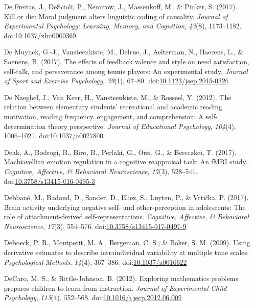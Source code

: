 \documentclass[english,man]{apa6}
\theoremstyle{definition}
\theoremstyle{definition}
\theoremstyle{definition}
\theoremstyle{remark}
\begin{document}
\hypertarget{ref-DeFreitas2017}{}
De Freitas, J., DeScioli, P., Nemirow, J., Massenkoff, M., \& Pinker, S.
(2017). Kill or die: Moral judgment alters linguistic coding of
causality. \emph{Journal of Experimental Psychology: Learning, Memory,
and Cognition}, \emph{43}(8), 1173--1182.
doi:\href{https://doi.org/10.1037/xlm0000369}{10.1037/xlm0000369}

\hypertarget{ref-DeMuynck2017a}{}
De Muynck, G.-J., Vansteenkiste, M., Delrue, J., Aelterman, N., Haerens,
L., \& Soenens, B. (2017). The effects of feedback valence and style on
need satisfaction, self-talk, and perseverance among tennis players: An
experimental study. \emph{Journal of Sport and Exercise Psychology},
\emph{39}(1), 67--80.
doi:\href{https://doi.org/10.1123/jsep.2015-0326}{10.1123/jsep.2015-0326}

\hypertarget{ref-DeNaeghel2012}{}
De Naeghel, J., Van Keer, H., Vansteenkiste, M., \& Rosseel, Y. (2012).
The relation between elementary students' recreational and academic
reading motivation, reading frequency, engagement, and comprehension: A
self-determination theory perspective. \emph{Journal of Educational
Psychology}, \emph{104}(4), 1006--1021.
doi:\href{https://doi.org/10.1037/a0027800}{10.1037/a0027800}

\hypertarget{ref-Deak2017}{}
Deak, A., Bodrogi, B., Biro, B., Perlaki, G., Orsi, G., \& Bereczkei, T.
(2017). Machiavellian emotion regulation in a cognitive reappraisal
task: An fMRI study. \emph{Cognitive, Affective, \& Behavioral
Neuroscience}, \emph{17}(3), 528--541.
doi:\href{https://doi.org/10.3758/s13415-016-0495-3}{10.3758/s13415-016-0495-3}

\hypertarget{ref-Debbane2017}{}
Debbané, M., Badoud, D., Sander, D., Eliez, S., Luyten, P., \& Vrtička,
P. (2017). Brain activity underlying negative self- and other-perception
in adolescents: The role of attachment-derived self-representations.
\emph{Cognitive, Affective, \& Behavioral Neuroscience}, \emph{17}(3),
554--576.
doi:\href{https://doi.org/10.3758/s13415-017-0497-9}{10.3758/s13415-017-0497-9}

\hypertarget{ref-Deboeck2009}{}
Deboeck, P. R., Montpetit, M. A., Bergeman, C. S., \& Boker, S. M.
(2009). Using derivative estimates to describe intraindividual
variability at multiple time scales. \emph{Psychological Methods},
\emph{14}(4), 367--386.
doi:\href{https://doi.org/10.1037/a0016622}{10.1037/a0016622}

\hypertarget{ref-DeCaro2012}{}
DeCaro, M. S., \& Rittle-Johnson, B. (2012). Exploring mathematics
problems prepares children to learn from instruction. \emph{Journal of
Experimental Child Psychology}, \emph{113}(4), 552--568.
doi:\href{https://doi.org/10.1016/j.jecp.2012.06.009}{10.1016/j.jecp.2012.06.009}
\end{document}
